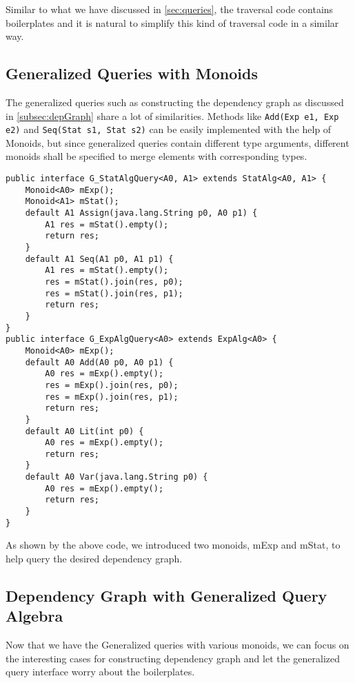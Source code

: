 Similar to what we have discussed in \ref{sec:queries}, the traversal code contains boilerplates and it is natural to simplify this kind of traversal code in a similar way. 

\subsection{Generalized Queries with Monoids}\label{subsec:generalizedQuery}
The generalized queries such as constructing the dependency graph as discussed in \ref{subsec:depGraph} share a lot of similarities. Methods like \lstinline{Add(Exp e1, Exp e2)} and \lstinline{Seq(Stat s1, Stat s2)} can be easily implemented with the help of Monoids, but since generalized queries contain different type arguments, different monoids shall be specified to merge elements with corresponding types. 

\begin{lstlisting}[numbers=none]
public interface G_StatAlgQuery<A0, A1> extends StatAlg<A0, A1> {
	Monoid<A0> mExp();
	Monoid<A1> mStat();
	default A1 Assign(java.lang.String p0, A0 p1) {
		A1 res = mStat().empty();
		return res;
	}
	default A1 Seq(A1 p0, A1 p1) {
		A1 res = mStat().empty();
		res = mStat().join(res, p0);
		res = mStat().join(res, p1);
		return res;
	}
}
public interface G_ExpAlgQuery<A0> extends ExpAlg<A0> {
	Monoid<A0> mExp();
	default A0 Add(A0 p0, A0 p1) {
		A0 res = mExp().empty();
		res = mExp().join(res, p0);
		res = mExp().join(res, p1);
		return res;
	}
	default A0 Lit(int p0) {
		A0 res = mExp().empty();
		return res;
	}
	default A0 Var(java.lang.String p0) {
		A0 res = mExp().empty();
		return res;
	}
}
\end{lstlisting}
As shown by the above code, we introduced two monoids, mExp and mStat, to help query the desired dependency graph. 

\subsection{Dependency Graph with Generalized Query Algebra}\label{subsec:DepGraphWithGeneralizedQuery}
Now that we have the Generalized queries with various monoids, we can focus on the interesting cases for constructing dependency graph and let the generalized query interface worry about the boilerplates. 

